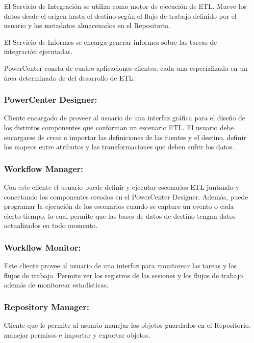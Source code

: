El Servicio de Integración se utiliza como motor de ejecución de ETL. Mueve los datos desde el origen hasta el 
destino según el flujo de trabajo definido por el usuario y los metadatos almacenados en el Repositorio.

El Servicio de Informes se encarga generar informes sobre las tareas de integración ejecutadas.


PowerCenter consta de cuatro aplicaciones clientes, cada una especializada en un \'area determinada de del 
desarrollo de ETL:

\subsubsection{PowerCenter Designer:}

Cliente encargado de proveer al usuario de una interfaz gráfica para el diseño de los distintos componentes 
que conforman un escenario ETL. El usuario debe encargarse de crear o importar las definiciones de las fuentes y el 
destino, definir los mapeos entre atributos y las transformaciones que deben sufrir los datos.

\subsubsection{Workflow Manager:}

Con este cliente el usuario puede definir y ejecutar escenarios ETL juntando y conectando los componentes creados en el 
PowerCenter Designer. Adem\'as, puede programar la ejecución de los escenarios cuando se capture un evento o cada 
cierto tiempo, lo cual permite que las bases de datos de destino tengan datos actualizados en todo momento.

\subsubsection{Workflow Monitor:} 

Este cliente provee al usuario de una interfaz para monitorear las tareas y los flujos de trabajo. Permite ver 
los registros de las sesiones y los flujos de trabajo además de monitorear estadísticas.

\subsubsection{Repository Manager:}

Cliente que le permite al usuario manejar los objetos guardados en el Repositorio, manejar permisos e 
importar y exportar objetos.





